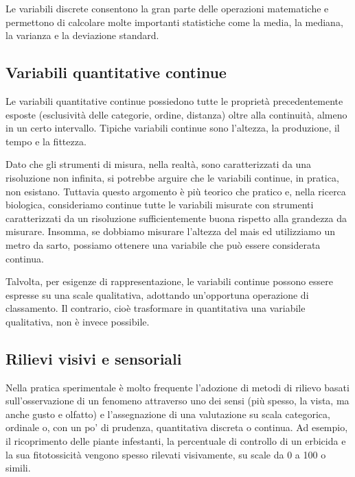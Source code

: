 \documentclass[
  12pt,
]{book}
\begin{document}
Le variabili discrete consentono la gran parte delle operazioni matematiche e permettono di calcolare molte importanti statistiche come la media, la mediana, la varianza e la deviazione standard.

\hypertarget{variabili-quantitative-continue}{%
\subsection{Variabili quantitative continue}\label{variabili-quantitative-continue}}

Le variabili quantitative continue possiedono tutte le proprietà precedentemente esposte (esclusività delle categorie, ordine, distanza) oltre alla continuità, almeno in un certo intervallo. Tipiche variabili continue sono l'altezza, la produzione, il tempo e la fittezza.

Dato che gli strumenti di misura, nella realtà, sono caratterizzati da una risoluzione non infinita, si potrebbe arguire che le variabili continue, in pratica, non esistano. Tuttavia questo argomento è più teorico che pratico e, nella ricerca biologica, consideriamo continue tutte le variabili misurate con strumenti caratterizzati da un risoluzione sufficientemente buona rispetto alla grandezza da misurare. Insomma, se dobbiamo misurare l'altezza del mais ed utilizziamo un metro da sarto, possiamo ottenere una variabile che può essere considerata continua.

Talvolta, per esigenze di rappresentazione, le variabili continue possono essere espresse su una scale qualitativa, adottando un'opportuna operazione di classamento. Il contrario, cioè trasformare in quantitativa una variabile qualitativa, non è invece possibile.

\hypertarget{rilievi-visivi-e-sensoriali}{%
\subsection{Rilievi visivi e sensoriali}\label{rilievi-visivi-e-sensoriali}}

Nella pratica sperimentale è molto frequente l'adozione di metodi di rilievo basati sull'osservazione di un fenomeno attraverso uno dei sensi (più spesso, la vista, ma anche gusto e olfatto) e l'assegnazione di una valutazione su scala categorica, ordinale o, con un po' di prudenza, quantitativa discreta o continua. Ad esempio, il ricoprimento delle piante infestanti, la percentuale di controllo di un erbicida e la sua fitotossicità vengono spesso rilevati visivamente, su scale da 0 a 100 o simili.
\end{document}
